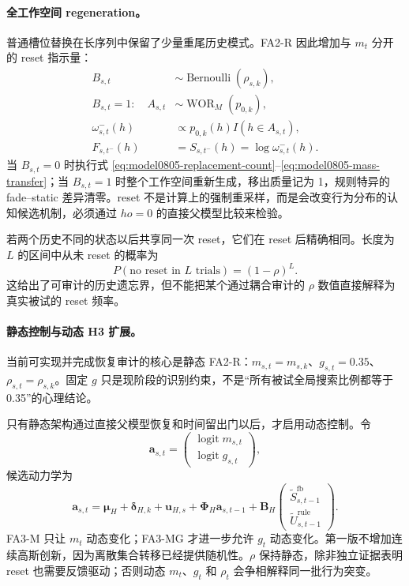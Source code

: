 \paragraph{全工作空间 regeneration。}
普通槽位替换在长序列中保留了少量重尾历史模式。FA2-R 因此增加与 $m_t$ 分开的 reset 指示量：
\begin{equation}
\begin{aligned}
    B_{s,t}&\sim\operatorname{Bernoulli}(\rho_{s,k}),\\
    B_{s,t}=1:\quad
    A_{s,t}&\sim\operatorname{WOR}_M(p_{0,k}),\\
    \omega^-_{s,t}(h)
    &\propto p_{0,k}(h)I(h\in A_{s,t}),\\
    F_{s,t^-}(h)&=S_{s,t^-}(h)=\log\omega^-_{s,t}(h).
\end{aligned}
\label{eq:model0805-regeneration}
\end{equation}
当 $B_{s,t}=0$ 时执行式 \ref{eq:model0805-replacement-count}--\ref{eq:model0805-mass-transfer}；当 $B_{s,t}=1$ 时整个工作空间重新生成，移出质量记为 1，规则特异的 fade--static 差异清零。reset 不是计算上的强制重采样，而是会改变行为分布的认知候选机制，必须通过 $
ho=0$ 的直接父模型比较来检验。

若两个历史不同的状态以后共享同一次 reset，它们在 reset 后精确相同。长度为 $L$ 的区间中从未 reset 的概率为
\begin{equation}
    P(\text{no reset in }L\text{ trials})=(1-\rho)^L.
    \label{eq:model0805-reset-bound}
\end{equation}
这给出了可审计的历史遗忘界，但不能把某个通过耦合审计的 $\rho$ 数值直接解释为真实被试的 reset 频率。

\paragraph{静态控制与动态 H3 扩展。}
当前可实现并完成恢复审计的核心是静态 FA2-R：$m_{s,t}=m_{s,k}$、$g_{s,t}=0.35$、$\rho_{s,t}=\rho_{s,k}$。固定 $g$ 只是现阶段的识别约束，不是“所有被试全局搜索比例都等于 0.35”的心理结论。

只有静态架构通过直接父模型恢复和时间留出门以后，才启用动态控制。令
\begin{equation}
    \mathbf a_{s,t}
    =\begin{pmatrix}
      \operatorname{logit}m_{s,t}\\
      \operatorname{logit}g_{s,t}
    \end{pmatrix},
\end{equation}
候选动力学为
\begin{equation}
    \mathbf a_{s,t}
    =\boldsymbol\mu_H+\boldsymbol\delta_{H,k}+\mathbf u_{H,s}
     +\boldsymbol\Phi_H\mathbf a_{s,t-1}
     +\mathbf B_H
      \begin{pmatrix}
      \widetilde S^{\mathrm{fb}}_{s,t-1}\\
      \widetilde U^{\mathrm{rule}}_{s,t-1}
      \end{pmatrix}.
    \label{eq:model0805-control-dynamics}
\end{equation}
FA3-M 只让 $m_t$ 动态变化；FA3-MG 才进一步允许 $g_t$ 动态变化。第一版不增加连续高斯创新，因为离散集合转移已经提供随机性。$\rho$ 保持静态，除非独立证据表明 reset 也需要反馈驱动；否则动态 $m_t$、$g_t$ 和 $\rho_t$ 会争相解释同一批行为突变。


